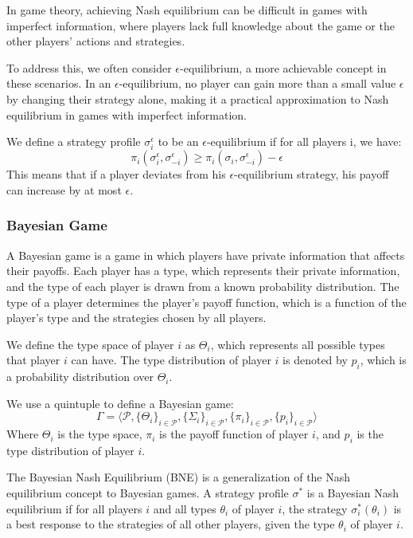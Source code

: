 \documentclass[11pt]{article}
\begin{document}
In game theory, achieving Nash equilibrium can be difficult in games with imperfect information, where players lack full knowledge about the game or the other players' actions and strategies.

To address this, we often consider $\epsilon$-equilibrium, a more achievable concept in these scenarios. In an $\epsilon$-equilibrium, no player can gain more than a small value $\epsilon$ by changing their strategy alone, making it a practical approximation to Nash equilibrium in games with imperfect information.

We define a strategy profile $\sigma^\epsilon_i$ to be an $\epsilon$-equilibrium if for all players i, we have:
$$
\pi_i(\sigma^\epsilon_i,\sigma^\epsilon_{-i}) \geq \pi_i(\sigma_i, \sigma^\epsilon_{-i}) - \epsilon
$$
This means that if a player deviates from his $\epsilon$-equilibrium strategy, his payoff can increase by at most $\epsilon$.
\subsubsection{Bayesian Game}
A Bayesian game is a game in which players have private information that affects their payoffs. Each player has a type, which represents their private information, and the type of each player is drawn from a known probability distribution. The type of a player determines the player's payoff function, which is a function of the player's type and the strategies chosen by all players.

We define the type space of player $i$ as $\Theta_i$, which represents all possible types that player $i$ can have. The type distribution of player $i$ is denoted by $p_i$, which is a probability distribution over $\Theta_i$.

We use a quintuple to define a Bayesian game:
\begin{equation}
\Gamma = \langle \mathcal{P}, \{\Theta_i\}_{i\in\mathcal{P}}, \{\Sigma_i\}_{i\in\mathcal{P}}, \{\pi_i\}_{i\in\mathcal{P}}, \{p_i\}_{i\in\mathcal{P}} \rangle
\end{equation}
Where $\Theta_i$ is the type space, $\pi_i$ is the payoff function of player $i$, and $p_i$ is the type distribution of player $i$.

The Bayesian Nash Equilibrium (BNE) is a generalization of the Nash equilibrium concept to Bayesian games. A strategy profile $\sigma^*$ is a Bayesian Nash equilibrium if for all players $i$ and all types $\theta_i$ of player $i$, the strategy $\sigma_i^*(\theta_i)$ is a best response to the strategies of all other players, given the type $\theta_i$ of player $i$.
\end{document}
